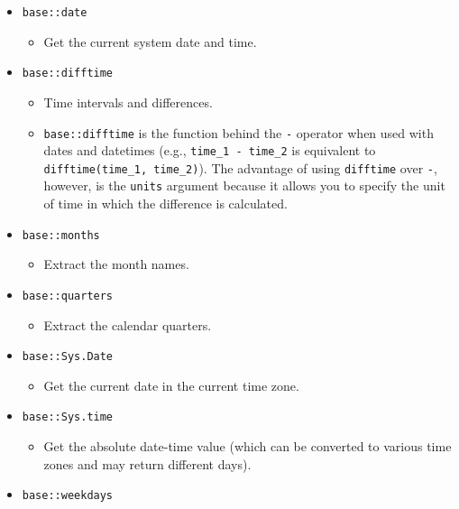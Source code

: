 \documentclass[
]{book}
\providecommand{\tightlist}{%
  \setlength{\itemsep}{0pt}\setlength{\parskip}{0pt}}
\begin{document}
\begin{itemize}
\tightlist
\item
  \texttt{base::date}

  \begin{itemize}
  \tightlist
  \item
    Get the current system date and time.
  \end{itemize}
\item
  \texttt{base::difftime}

  \begin{itemize}
  \tightlist
  \item
    Time intervals and differences.
  \item
    \texttt{base::difftime} is the function behind the \texttt{-} operator when used with dates and datetimes (e.g., \texttt{time\_1\ -\ time\_2} is equivalent to \texttt{difftime(time\_1,\ time\_2)}). The advantage of using \texttt{difftime} over \texttt{-}, however, is the \texttt{units} argument because it allows you to specify the unit of time in which the difference is calculated.
  \end{itemize}
\item
  \texttt{base::months}

  \begin{itemize}
  \tightlist
  \item
    Extract the month names.
  \end{itemize}
\item
  \texttt{base::quarters}

  \begin{itemize}
  \tightlist
  \item
    Extract the calendar quarters.
  \end{itemize}
\item
  \texttt{base::Sys.Date}

  \begin{itemize}
  \tightlist
  \item
    Get the current date in the current time zone.
  \end{itemize}
\item
  \texttt{base::Sys.time}

  \begin{itemize}
  \tightlist
  \item
    Get the absolute date-time value (which can be converted to various time zones and may return different days).
  \end{itemize}
\item
  \texttt{base::weekdays}


\end{itemize}
\end{document}
